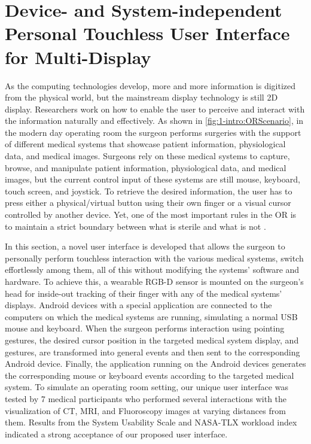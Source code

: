 %
\section{Device- and System-independent Personal Touchless User Interface for Multi-Display}
\label{sec:4-IPCAI}
As the computing technologies develop, more and more information is digitized from the physical world, but the mainstream display technology is still 2D display.
Researchers work on how to enable the user to perceive and interact with the information naturally and effectively.
As shown in \figurename{\ref{fig:1-intro:ORScenario}}, in the modern day operating room the surgeon performs surgeries with the support of different medical systems that showcase patient information, physiological data, and medical images. 
Surgeons rely on these medical systems to capture, browse, and manipulate patient information, physiological data, and medical images, but the current control input of these systems are still mouse, keyboard, touch screen, and joystick. 
To retrieve the desired information, the user has to press either a physical/virtual button using their own finger or a visual cursor controlled by another device. 
Yet, one of the most important rules in the OR is to maintain a strict boundary between what is sterile and what is not \cite{OHara2014a}.

In this section, a novel user interface is developed that allows the surgeon to personally perform touchless interaction with the various medical systems, switch effortlessly among them, all of this without modifying the systems' software and hardware.
To achieve this, a wearable RGB-D sensor is mounted on the surgeon's head for inside-out tracking of their finger with any of the medical systems' displays. Android devices with a special application are connected to the computers on which the medical systems are running, simulating a normal USB mouse and keyboard. When the surgeon performs interaction using pointing gestures, the desired cursor position in the targeted medical system display, and gestures, are transformed into general events and then sent to the corresponding Android device. Finally, the application running on the Android devices generates the corresponding mouse or keyboard events according to the targeted medical system.
To simulate an operating room setting, our unique user interface was tested by 7 medical participants who performed several interactions with {the visualization of CT, MRI, and Fluoroscopy images} at varying distances from them. Results from the System Usability Scale and NASA-TLX workload index indicated a strong acceptance of our proposed user interface.

